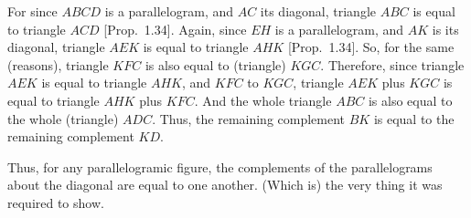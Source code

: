 \begin{Parallel}{}{}
{For since $ABCD$ is a parallelogram, and $AC$ its diagonal,  triangle
$ABC$ is equal to triangle $ACD$ [Prop.~1.34]. Again, since $EH$ is
a parallelogram, and $AK$ is its diagonal, triangle $AEK$ is equal to
triangle $AHK$ [Prop.~1.34]. So, for the same (reasons), triangle
$KFC$ is also equal to (triangle) $KGC$. Therefore, since triangle $AEK$ is
equal to triangle $AHK$, and $KFC$ to $KGC$, triangle $AEK$ plus $KGC$ is
equal to triangle $AHK$ plus $KFC$. And the whole triangle $ABC$ is
also equal to the whole (triangle) $ADC$. Thus, the remaining complement
$BK$ is equal to the remaining complement $KD$.

Thus, for any parallelogramic figure, the complements of the
parallelograms about the diagonal are equal to one another.
(Which is) the very thing it was required to show.}
\end{Parallel}

